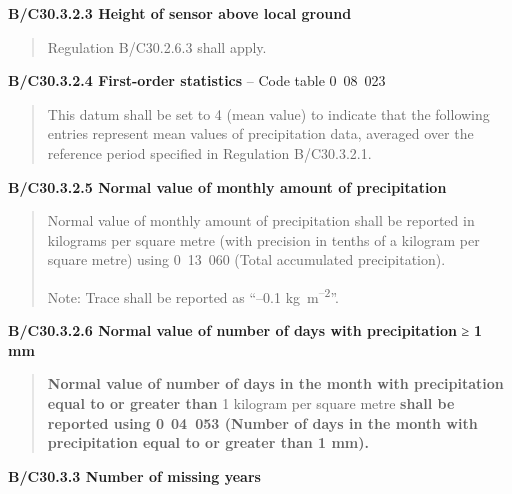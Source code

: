 \textbf{B/C30.3.2.3 Height of sensor above local ground}

\begin{quote}
Regulation B/C30.2.6.3 shall apply.
\end{quote}

\textbf{B/C30.3.2.4 First-order statistics} -- Code table 0~08~023

\begin{quote}
This datum shall be set to 4 (mean value) to indicate that the following entries represent mean values of precipitation data, averaged over the reference period specified in Regulation B/C30.3.2.1.
\end{quote}

\textbf{B/C30.3.2.5 Normal value of monthly amount of precipitation}

\begin{quote}
Normal value of monthly amount of precipitation shall be reported in kilograms per square metre (with precision in tenths of a kilogram per square metre) using 0~13~060 (Total accumulated precipitation).

Note: Trace shall be reported as ``--0.1 kg~m\textsuperscript{--2}''.
\end{quote}

\textbf{B/C30.3.2.6 Normal value of number of days with precipitation} ≥ \textbf{1 mm}

\begin{quote}
\textbf{Normal value of number of days in the month with precipitation equal to or greater than} 1 kilogram per square metre \textbf{shall be reported using 0}~\textbf{04~053 (Number of days in the month with precipitation equal to or greater than 1 mm).}
\end{quote}

\textbf{B/C30.3.3 Number of missing years}

